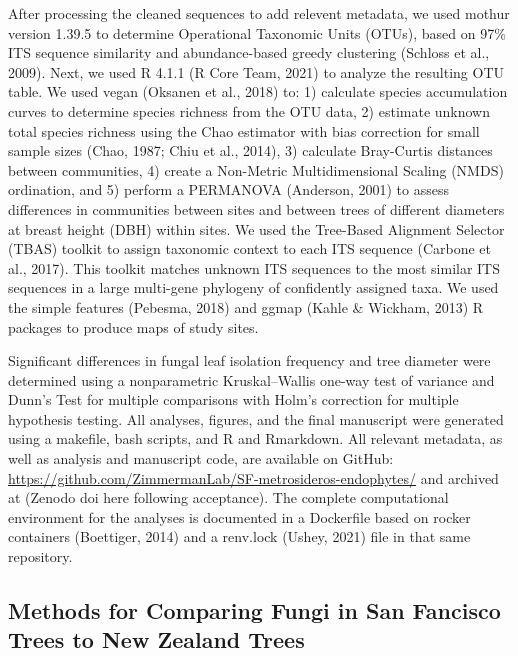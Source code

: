\documentclass[fleqn,10pt,lineno]{wlpeerj} %
\begin{document}
After processing the cleaned sequences to add relevent metadata, we used mothur version 1.39.5 to determine Operational Taxonomic Units (OTUs), based on 97\% ITS sequence similarity and abundance-based greedy clustering (Schloss et al., 2009). Next, we used R 4.1.1 (R Core Team, 2021) to analyze the resulting OTU table. We used vegan (Oksanen et al., 2018) to: 1) calculate species accumulation curves to determine species richness from the OTU data, 2) estimate unknown total species richness using the Chao estimator with bias correction for small sample sizes (Chao, 1987; Chiu et al., 2014), 3) calculate Bray-Curtis distances between communities, 4) create a Non-Metric Multidimensional Scaling (NMDS) ordination, and 5) perform a PERMANOVA (Anderson, 2001) to assess differences in communities between sites and between trees of different diameters at breast height (DBH) within sites. We used the Tree-Based Alignment Selector (TBAS) toolkit to assign taxonomic context to each ITS sequence (Carbone et al., 2017). This toolkit matches unknown ITS sequences to the most similar ITS sequences in a large multi-gene phylogeny of confidently assigned taxa. We used the simple features (Pebesma, 2018) and ggmap (Kahle \& Wickham, 2013) R packages to produce maps of study sites.

Significant differences in fungal leaf isolation frequency and tree diameter were determined using a nonparametric Kruskal--Wallis one-way test of variance and Dunn's Test for multiple comparisons with Holm's correction for multiple hypothesis testing. All analyses, figures, and the final manuscript were generated using a makefile, bash scripts, and R and Rmarkdown. All relevant metadata, as well as analysis and manuscript code, are available on GitHub: \url{https://github.com/ZimmermanLab/SF-metrosideros-endophytes/} and archived at (Zenodo doi here following acceptance). The complete computational environment for the analyses is documented in a Dockerfile based on rocker containers (Boettiger, 2014) and a renv.lock (Ushey, 2021) file in that same repository.

\hypertarget{methods-for-comparing-fungi-in-san-fancisco-trees-to-new-zealand-trees}{%
\subsection*{Methods for Comparing Fungi in San Fancisco Trees to New Zealand Trees}\label{methods-for-comparing-fungi-in-san-fancisco-trees-to-new-zealand-trees}}
\end{document}
